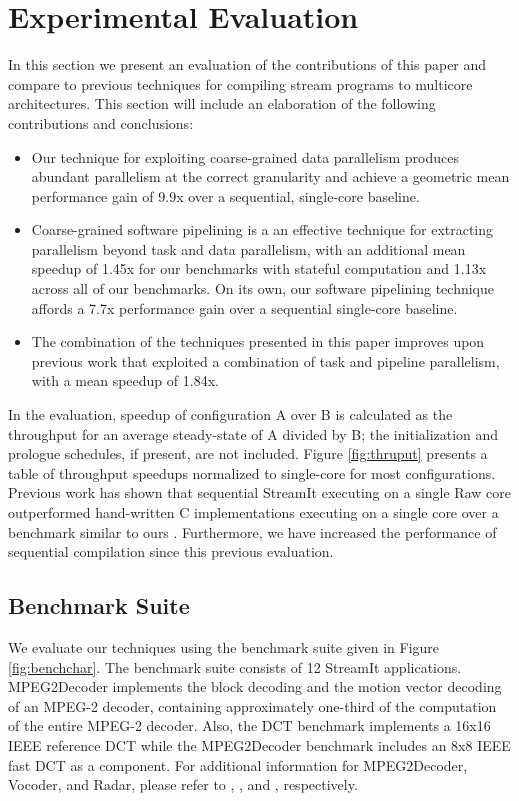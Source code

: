 \section{Experimental Evaluation}

In this section we present an evaluation of the contributions of this
paper and compare to previous techniques for compiling stream programs
to multicore architectures.  This section will include an elaboration
of the following contributions and conclusions:

\begin{itemize}
\item Our technique for exploiting coarse-grained data parallelism
produces abundant parallelism at the correct granularity and achieve a
geometric mean performance gain of 9.9x over a sequential, single-core
baseline.
\item Coarse-grained software pipelining is a
an effective technique for extracting parallelism beyond task and data
parallelism, with an additional mean speedup of 1.45x for
our benchmarks with stateful computation and 1.13x across all of our
benchmarks. On its own, our software pipelining technique affords a
7.7x performance gain over a sequential single-core baseline.
\item The combination of the techniques presented in this paper
improves upon previous work that exploited a combination of task and
pipeline parallelism, with a mean speedup of 1.84x.
\end{itemize}

In the evaluation, speedup of configuration A over B is calculated as
the throughput for an average steady-state of A divided by B; the
initialization and prologue schedules, if present, are not
included. Figure \ref{fig:thruput} presents a table of throughput
speedups normalized to single-core for most configurations.  Previous
work has shown that sequential StreamIt executing on a single Raw core
outperformed hand-written C implementations executing on a single core
over a benchmark similar to ours \cite{raw_isca}. Furthermore, we have
increased the performance of sequential compilation since this
previous evaluation.

\begin{figure*}[t]
\centering
{}
\caption{Benchmark description and characteristics.
\protect\label{fig:benchchar}}
\end{figure*}

\subsection{Benchmark Suite}
We evaluate our techniques using the benchmark suite given in Figure
\ref{fig:benchchar}.   The benchmark suite consists of 12 StreamIt
applications. MPEG2Decoder implements the block decoding and the
motion vector decoding of an MPEG-2 decoder, containing approximately
one-third of the computation of the entire MPEG-2 decoder.  Also, the
DCT benchmark implements a 16x16 IEEE reference DCT while the
MPEG2Decoder benchmark includes an 8x8 IEEE fast DCT as a component.
For additional information for MPEG2Decoder, Vocoder, and Radar,
please refer to \cite{ipdps2006},
\cite{seneff80}, and \cite{pca}, respectively. 

